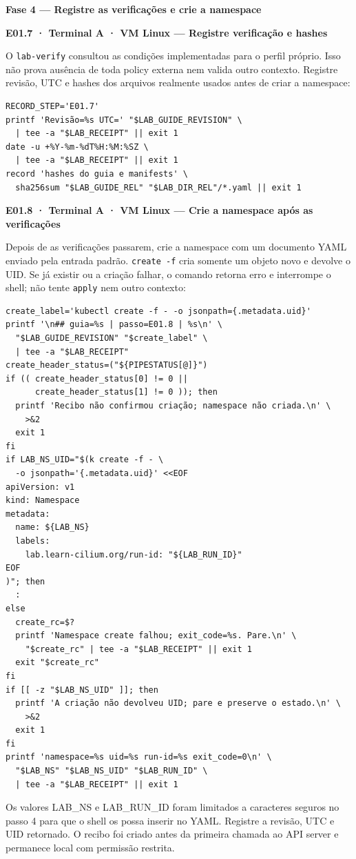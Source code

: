 \documentclass[12pt,openany,oneside,a4paper,chapter=TITLE,english,brazil]{abntex2}
\begin{document}
\textbf{Fase 4 --- Registre as verificações e crie a namespace}

\textbf{E01.7 · Terminal A · VM Linux --- Registre verificação e hashes}

O \texttt{lab-{}\allowbreak{}verify} consultou as condições implementadas para o perfil próprio. Isso não prova ausência de toda policy externa nem valida outro contexto. Registre revisão, UTC e hashes dos arquivos realmente usados antes de criar a namespace:

\begin{verbatim}
RECORD_STEP='E01.7'
printf 'Revisão=%s UTC=' "$LAB_GUIDE_REVISION" \
  | tee -a "$LAB_RECEIPT" || exit 1
date -u +%Y-%m-%dT%H:%M:%SZ \
  | tee -a "$LAB_RECEIPT" || exit 1
record 'hashes do guia e manifests' \
  sha256sum "$LAB_GUIDE_REL" "$LAB_DIR_REL"/*.yaml || exit 1
\end{verbatim}

\textbf{E01.8 · Terminal A · VM Linux --- Crie a namespace após as verificações}

Depois de as verificações passarem, crie a namespace com um documento YAML enviado pela entrada padrão. \texttt{create -{}\allowbreak{}f} cria somente um objeto novo e devolve o UID. Se já existir ou a criação falhar, o comando retorna erro e interrompe o shell; não tente \texttt{apply} nem outro contexto:

\begin{verbatim}
create_label='kubectl create -f - -o jsonpath={.metadata.uid}'
printf '\n## guia=%s | passo=E01.8 | %s\n' \
  "$LAB_GUIDE_REVISION" "$create_label" \
  | tee -a "$LAB_RECEIPT"
create_header_status=("${PIPESTATUS[@]}")
if (( create_header_status[0] != 0 ||
      create_header_status[1] != 0 )); then
  printf 'Recibo não confirmou criação; namespace não criada.\n' \
    >&2
  exit 1
fi
if LAB_NS_UID="$(k create -f - \
  -o jsonpath='{.metadata.uid}' <<EOF
apiVersion: v1
kind: Namespace
metadata:
  name: ${LAB_NS}
  labels:
    lab.learn-cilium.org/run-id: "${LAB_RUN_ID}"
EOF
)"; then
  :
else
  create_rc=$?
  printf 'Namespace create falhou; exit_code=%s. Pare.\n' \
    "$create_rc" | tee -a "$LAB_RECEIPT" || exit 1
  exit "$create_rc"
fi
if [[ -z "$LAB_NS_UID" ]]; then
  printf 'A criação não devolveu UID; pare e preserve o estado.\n' \
    >&2
  exit 1
fi
printf 'namespace=%s uid=%s run-id=%s exit_code=0\n' \
  "$LAB_NS" "$LAB_NS_UID" "$LAB_RUN_ID" \
  | tee -a "$LAB_RECEIPT" || exit 1
\end{verbatim}

Os valores LAB\_NS e LAB\_RUN\_ID foram limitados a caracteres seguros no passo 4 para que o shell os possa inserir no YAML. Registre a revisão, UTC e UID retornado. O recibo foi criado antes da primeira chamada ao API server e permanece local com permissão restrita.
\end{document}
